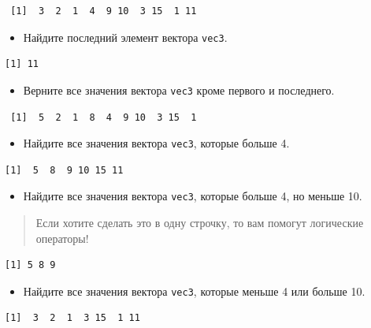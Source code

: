 \documentclass[
]{book}
\providecommand{\tightlist}{%
  \setlength{\itemsep}{0pt}\setlength{\parskip}{0pt}}
\begin{document}
\begin{verbatim}
 [1]  3  2  1  4  9 10  3 15  1 11
\end{verbatim}

\begin{itemize}
\tightlist
\item
  Найдите последний элемент вектора \texttt{vec3}.
\end{itemize}

\begin{verbatim}
[1] 11
\end{verbatim}

\begin{itemize}
\tightlist
\item
  Верните все значения вектора \texttt{vec3} кроме первого и последнего.
\end{itemize}

\begin{verbatim}
 [1]  5  2  1  8  4  9 10  3 15  1
\end{verbatim}

\begin{itemize}
\tightlist
\item
  Найдите все значения вектора \texttt{vec3}, которые больше 4.
\end{itemize}

\begin{verbatim}
[1]  5  8  9 10 15 11
\end{verbatim}

\begin{itemize}
\tightlist
\item
  Найдите все значения вектора \texttt{vec3}, которые больше 4, но меньше 10.
\end{itemize}

\begin{quote}
Если хотите сделать это в одну строчку, то вам помогут логические операторы!
\end{quote}

\begin{verbatim}
[1] 5 8 9
\end{verbatim}

\begin{itemize}
\tightlist
\item
  Найдите все значения вектора \texttt{vec3}, которые меньше 4 или больше 10.
\end{itemize}

\begin{verbatim}
[1]  3  2  1  3 15  1 11
\end{verbatim}
\end{document}
